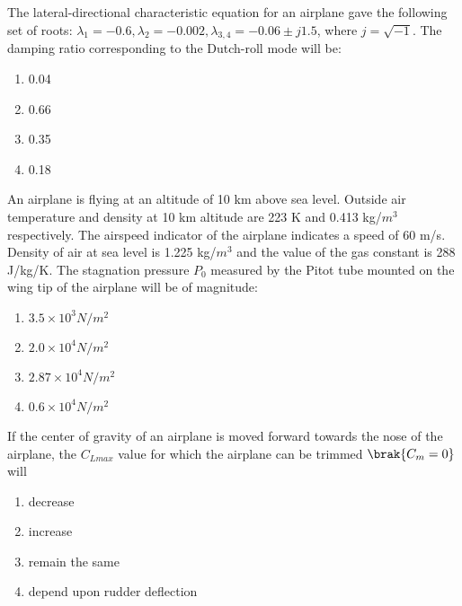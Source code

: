 \iffalse
\author{EE24BTECH11047}
\section{ae}
\chapter{2007}
\fi

\item The lateral-directional characteristic equation for an airplane gave the following set of roots: $\lambda_1 = -0.6, \lambda_2 = -0.002, \lambda_{3,4} = -0.06 \pm j1.5$, where $j = \sqrt{-1}$. The damping ratio corresponding to the Dutch-roll mode will be:
    \begin{enumerate}
        \item 0.04
        \item 0.66
        \item 0.35
        \item 0.18
    \end{enumerate}

    \item An airplane is flying at an altitude of 10 km above sea level. Outside air temperature and density at 10 km altitude are 223 K and 0.413 kg/$m^3$ respectively. The airspeed indicator of the airplane indicates a speed of 60 m/s. Density of air at sea level is 1.225 kg/$m^3$ and the value of the gas constant  is 288 J/kg/K. The stagnation pressure $P_0$ measured by the Pitot tube mounted on the wing tip of the airplane will be of magnitude:
    \begin{enumerate}
        \item $3.5 \times 10^3 N/m^2$
        \item $2.0 \times 10^4 N/m^2$
        \item $2.87 \times 10^4 N/m^2$
        \item $0.6 \times 10^4 N/m^2$
    \end{enumerate}

    \item If the center of gravity of an airplane is moved forward towards the nose of the airplane, the $C_{Lmax}$  value for which the airplane can be trimmed $\brak{C_m = 0}$ will
    \begin{enumerate}
        \item decrease
        \item increase
        \item remain the same
        \item depend upon rudder deflection
    \end{enumerate}

